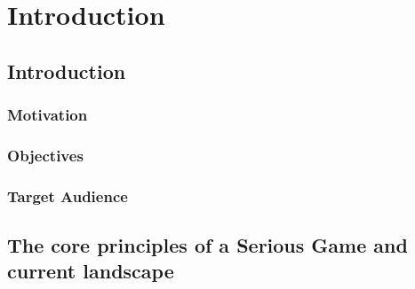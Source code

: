 \chapter{Introduction}
\label{chap:introduction}

\section{Introduction}

\subsection{Motivation}

\subsection{Objectives}

\subsection{Target Audience}

\section{The core principles of a Serious Game and current landscape}


